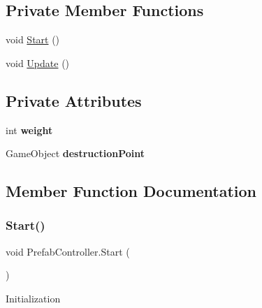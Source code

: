 \subsection*{Private Member Functions}
\begin{DoxyCompactItemize}
\item 
void \mbox{\hyperlink{class_prefab_controller_a6564f9cc825b0217ad3d84ae44d960c8}{Start}} ()
\item 
void \mbox{\hyperlink{class_prefab_controller_a015195ad8b9badff4fa97707116febe2}{Update}} ()
\end{DoxyCompactItemize}
\subsection*{Private Attributes}
\begin{DoxyCompactItemize}
\item 
\mbox{\label{class_prefab_controller_a949ca990cffb1c3669714124f926d7bf}} 
int {\bfseries weight}
\item 
\mbox{\label{class_prefab_controller_a1750263fbcd19ce72d5364649dec4660}} 
Game\+Object {\bfseries destruction\+Point}
\end{DoxyCompactItemize}


\subsection{Member Function Documentation}
\mbox{\label{class_prefab_controller_a6564f9cc825b0217ad3d84ae44d960c8}} 
\subsubsection{\texorpdfstring{Start()}{Start()}}
{\footnotesize\ttfamily void Prefab\+Controller.\+Start (\begin{DoxyParamCaption}{ }\end{DoxyParamCaption})\hspace{0.3cm}{\ttfamily [private]}}

Initialization \mbox{\label{class_prefab_controller_a015195ad8b9badff4fa97707116febe2}} 
